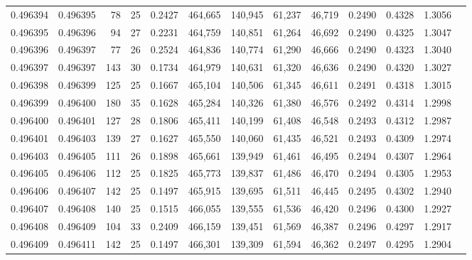 \begin{tabular}{rrrrrrrrrrrrr}
0.496394 & 0.496395 &  78 &  25 &                                     0.2427 & 464,665 & 140,945 &  61,237 &  46,719 & 0.2490 & 0.4328 & 1.3056 \\
0.496395 & 0.496396 &  94 &  27 &                                     0.2231 & 464,759 & 140,851 &  61,264 &  46,692 & 0.2490 & 0.4325 & 1.3047 \\
0.496396 & 0.496397 &  77 &  26 &                                     0.2524 & 464,836 & 140,774 &  61,290 &  46,666 & 0.2490 & 0.4323 & 1.3040 \\
0.496397 & 0.496397 & 143 &  30 &                                     0.1734 & 464,979 & 140,631 &  61,320 &  46,636 & 0.2490 & 0.4320 & 1.3027 \\
0.496398 & 0.496399 & 125 &  25 &                                     0.1667 & 465,104 & 140,506 &  61,345 &  46,611 & 0.2491 & 0.4318 & 1.3015 \\
0.496399 & 0.496400 & 180 &  35 &                                     0.1628 & 465,284 & 140,326 &  61,380 &  46,576 & 0.2492 & 0.4314 & 1.2998 \\
0.496400 & 0.496401 & 127 &  28 &                                     0.1806 & 465,411 & 140,199 &  61,408 &  46,548 & 0.2493 & 0.4312 & 1.2987 \\
0.496401 & 0.496403 & 139 &  27 &                                     0.1627 & 465,550 & 140,060 &  61,435 &  46,521 & 0.2493 & 0.4309 & 1.2974 \\
0.496403 & 0.496405 & 111 &  26 &                                     0.1898 & 465,661 & 139,949 &  61,461 &  46,495 & 0.2494 & 0.4307 & 1.2964 \\
0.496405 & 0.496406 & 112 &  25 &                                     0.1825 & 465,773 & 139,837 &  61,486 &  46,470 & 0.2494 & 0.4305 & 1.2953 \\
0.496406 & 0.496407 & 142 &  25 &                                     0.1497 & 465,915 & 139,695 &  61,511 &  46,445 & 0.2495 & 0.4302 & 1.2940 \\
0.496407 & 0.496408 & 140 &  25 &                                     0.1515 & 466,055 & 139,555 &  61,536 &  46,420 & 0.2496 & 0.4300 & 1.2927 \\
0.496408 & 0.496409 & 104 &  33 &                                     0.2409 & 466,159 & 139,451 &  61,569 &  46,387 & 0.2496 & 0.4297 & 1.2917 \\
0.496409 & 0.496411 & 142 &  25 &                                     0.1497 & 466,301 & 139,309 &  61,594 &  46,362 & 0.2497 & 0.4295 & 1.2904 \\

\end{tabular}
